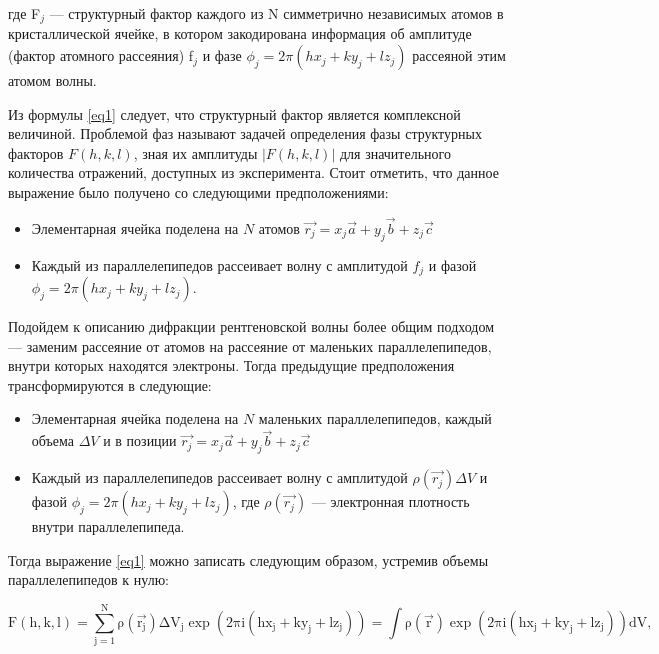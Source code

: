 где F$_j$ --- структурный фактор каждого из N симметрично независимых атомов в кристаллической ячейке, в котором закодирована информация об амплитуде (фактор атомного рассеяния) f$_j$ и фазе $\phi_j = 2\pi (hx_j+ky_j+lz_j)$ рассеяной этим атомом волны.

Из формулы \ref{eq1} следует, что структурный фактор является комплексной величиной. Проблемой фаз называют задачей определения фазы структурных факторов $F(h,k,l)$, зная их амплитуды $|F(h,k,l)|$ для значительного количества отражений, доступных из эксперимента. Стоит отметить, что данное выражение было получено со следующими предположениями:

\begin{itemize}
\item Элементарная ячейка поделена на $N$ атомов $\overrightarrow{r_j} = x_j\overrightarrow{a} + y_j\overrightarrow{b} + z_j\overrightarrow{c}$

\item Каждый из параллелепипедов рассеивает волну с амплитудой $f_j$  и фазой $\phi_j = 2\pi (hx_j+ky_j+lz_j)$.
\end{itemize}

Подойдем к описанию дифракции рентгеновской волны более общим подходом --- заменим рассеяние от атомов на рассеяние от маленьких параллелепипедов, внутри которых находятся электроны. Тогда предыдущие предположения трансформируются в следующие:

\begin{itemize}
\item Элементарная ячейка поделена на $N$ маленьких параллелепипедов, каждый объема $\Delta V$ и в позиции $\overrightarrow{r_j} = x_j\overrightarrow{a} + y_j\overrightarrow{b} + z_j\overrightarrow{c}$

\item Каждый из параллелепипедов рассеивает волну с амплитудой $\rho(\overrightarrow{r_j})\Delta V$  и фазой $\phi_j = 2\pi (hx_j+ky_j+lz_j)$, где $\rho(\overrightarrow{r_j})$ --- электронная плотность внутри параллелепипеда.
\end{itemize}

Тогда выражение \ref{eq1} можно записать следующим образом, устремив объемы параллелепипедов к нулю:

\begin{equation}\label{eq2}
\mathrm{ 
F(h,k,l) = \sum\limits_{j=1}^N \rho(\overrightarrow{r_j})\Delta V_j \exp(2\pi i(hx_j+ky_j+lz_j)) = \int\rho(\overrightarrow{r})\exp(2\pi i(hx_j+ky_j+lz_j))dV,}
\end{equation}

